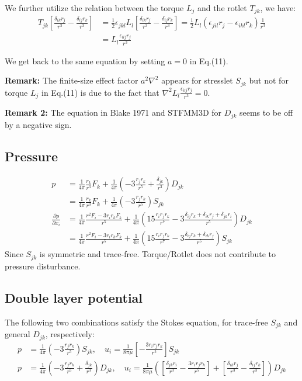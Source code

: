 \documentclass[11pt]{article}
\newcommand{\dpone}[2]{\ensuremath{\displaystyle\frac{\partial {#1}}{\partial {#2}}}}
\begin{document}
We further utilize the relation between the torque $L_j$ and the rotlet $T_{jk}$, we have:
\begin{align}
	T_{jk} \left[\frac{\delta_{ik}r_j}{r^3} -\frac{\delta_{ij}r_k}{r^3} \right] &= \frac{1}{2}\epsilon_{jkl}L_l \left[\frac{\delta_{ik}r_j}{r^3} -\frac{\delta_{ij}r_k}{r^3} \right] = \frac{1}{2} L_l \left(\epsilon_{jil}r_j - \epsilon_{ikl}r_k\right) \frac{1}{r^3} \\
	&= L_l \frac{\epsilon_{ilj}r_j}{r^3}
\end{align}

We get back to the same equation by setting $a=0$ in Eq.(11).

\textbf{Remark: } The finite-size effect factor $a^2\nabla^2$ appears for stresslet $S_{jk}$ but not for torque $L_j$ in Eq.(11) is due to the fact that $\nabla^2 L_l \frac{\epsilon_{ilj}r_j}{r^3} =0 $.

\textbf{Remark 2:} The equation in Blake 1971 and STFMM3D for $D_{jk}$ seems to be off by a negative sign. 

\subsection{Pressure}
\begin{align}
p &= \frac{1}{4\pi} \frac{r_k}{r^3} F_k + \frac{1}{4\pi}\left(-3\frac{r_jr_k}{r^5} + \frac{\delta_{jk}}{r^3}\right)D_{jk} \\
	& = \frac{1}{4\pi} \frac{r_k}{r^3} F_k + \frac{1}{4\pi}\left(-3\frac{r_jr_k}{r^5}\right)S_{jk}\\
	\dpone{p}{x_i} &= \frac{1}{4\pi}\frac{r^2 F_i - 3r_ir_kF_k}{r^5} + \frac{1}{4\pi} \left(15\frac{r_ir_jr_k}{r^7}-3\frac{\delta_{ij}r_k+\delta_{ik}r_j+\delta_{jk}r_i}{r^5}\right) D_{jk} \\
	&= \frac{1}{4\pi}\frac{r^2F_i - 3r_ir_kF_k}{r^5} + \frac{1}{4\pi} \left(15\frac{r_ir_jr_k}{r^7}-3\frac{\delta_{ij}r_k+\delta_{ik}r_j}{r^5}\right) S_{jk}
\end{align}
Since $S_{jk}$ is symmetric and trace-free.
Torque/Rotlet does not contribute to pressure disturbance.

\subsection{Double layer potential}
The following two combinations satisfy the Stokes equation, for trace-free $S_{jk}$ and general $D_{jk}$, respectively:
\begin{align}
	p& =\frac{1}{4\pi}\left(-3\frac{r_jr_k}{r^5}\right)S_{jk}, \quad u_i = \frac{1}{8\pi\mu}\left[ - \frac{3r_ir_jr_k}{r^5} \right] S_{jk} \\
	p& =\frac{1}{4\pi}\left(-3\frac{r_jr_k}{r^5} + \frac{\delta_{jk}}{r^3}\right)D_{jk}  ,\quad u_i = \frac{1}{8\pi\mu} \left(\left[ \frac{\delta_{jk}r_i}{r^3} - \frac{3r_ir_jr_k}{r^5} \right] + \left[\frac{\delta_{ik}r_j}{r^3} -\frac{\delta_{ij}r_k}{r^3} \right]\right)D_{jk}
\end{align}
\end{document}
